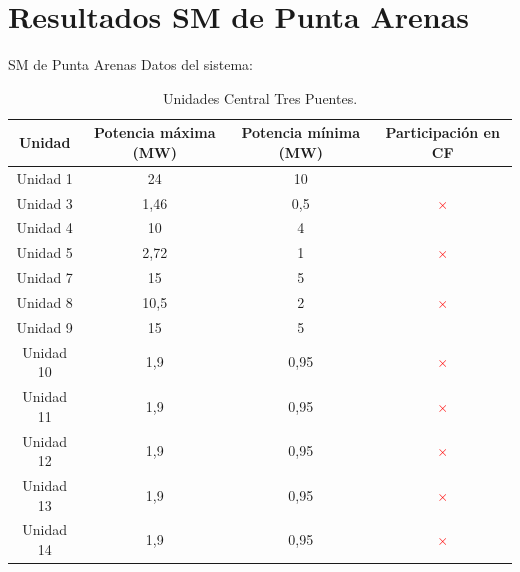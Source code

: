 
\section{Resultados SM de Punta Arenas}

\begin{frame}{SM de Punta Arenas}
{\small
Datos del sistema:}
\footnotesize

\begin{table}[H]
	\renewcommand{\arraystretch}{1.3}
	\centering
	\caption{Unidades Central Tres Puentes.}
	\label{tab:ud_CTP}
	\begin{tabular}{|c|c|c|c|}
		\hline 
		Unidad & Potencia máxima (MW) & Potencia mínima (MW) & Participación en CF \\
		\hline
		Unidad 1 & 24 & 10 & \textcolor{green!65!black}{\checkmark} \\
		Unidad 3 & 1,46 & 0,5 & \textcolor{red}{$\times$} \\
		Unidad 4 & 10 & 4 & \textcolor{green!65!black}{\checkmark} \\
		Unidad 5 & 2,72 & 1 & \textcolor{red}{$\times$} \\
		Unidad 7 & 15 & 5 & \textcolor{green!65!black}{\checkmark} \\
		Unidad 8 & 10,5 & 2 & \textcolor{red}{$\times$} \\
		Unidad 9 & 15 & 5 & \textcolor{green!65!black}{\checkmark} \\
		Unidad 10 & 1,9 & 0,95 & \textcolor{red}{$\times$} \\
		Unidad 11 & 1,9 & 0,95 & \textcolor{red}{$\times$} \\
		Unidad 12 & 1,9 & 0,95 & \textcolor{red}{$\times$} \\
		Unidad 13 & 1,9 & 0,95 & \textcolor{red}{$\times$} \\
		Unidad 14 & 1,9 & 0,95 & \textcolor{red}{$\times$} \\
		\hline
	\end{tabular}
\end{table}
\end{frame}

